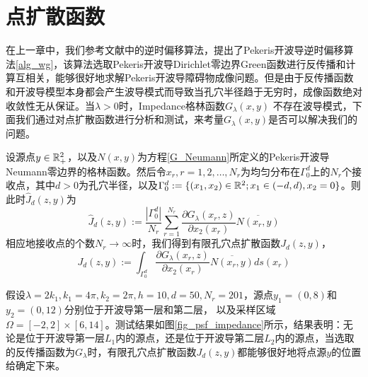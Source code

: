 \section{点扩散函数}
在上一章中，我们参考文献\cite{ch_ha,ch_cw}中的逆时偏移算法，提出了Pekeris开波导逆时偏移算法\ref{alg_wg}，该算法选取Pekeris开波导Dirichlet零边界Green函数进行反传播和计算互相关，能够很好地求解Pekeris开波导障碍物成像问题。但是由于反传播函数和开波导模型本身都会产生波导模式而导致当孔穴半径趋于无穷时，成像函数绝对收敛性无从保证。当$\lambda>0$时，Impedance格林函数$G_{\lambda}(x,y)$ 不存在波导模式，下面我们通过对点扩散函数进行分析和测试，来考量$G_{\lambda}(x,y)$是否可以解决我们的问题。

设源点$y\in\mathbb{R}^2_+$，以及$N(x,y)$为方程\eqref{G_Neumann}所定义的Pekeris开波导Neumann零边界的格林函数。然后令$x_r,r=1,2,\ldots,N_r$为均匀分布在$\Gamma_0^d$上的$N_r$个接收点，其中$d>0$为孔穴半径，以及$\Gamma_0^d:=\{(x_1,x_2)\in\mathbb{R}^2;x_1\in(-d,d),x_2=0\}$。则此时$\hat J_d(z,y)$为
\begin{equation}
 \hat J_d(z,y):=\frac{|\Gamma_0^d|}{N_r}\sum\limits_{r=1}^{N_r}\frac{\partial G_{\lambda}(x_r,z)}{\partial x_2(x_r)}\overline{N(x_r,y)}
\end{equation}
相应地接收点的个数$N_r\rightarrow\infty$时，我们得到有限孔穴点扩散函数$J_d(z,y)$，
\begin{equation}
  J_d(z,y):=\int_{\Gamma_0^d}\frac{\partial G_{\lambda}(x_r,z)}{\partial x_2(x_r)}\overline{N(x_r,y)}ds(x_r)
\end{equation}

假设$\lambda=2k_1,k_1=4\pi,k_2=2\pi,h=10,d=50,N_r=201$，源点$y_1=(0,8)$和$y_2=(0,12)$分别位于开波导第一层和第二层，
以及采样区域$\Omega=[-2,2]\times[6,14]$。测试结果如图\ref{fig_psf_impedance}所示，结果表明：无论是位于开波导第一层$L_1$内的源点，还是位于开波导第二层$L_2$内的源点，当选取的反传播函数为$G_{\lambda}$时，有限孔穴点扩散函数$J_d(z,y)$都能够很好地将点源$y$的位置给确定下来。

